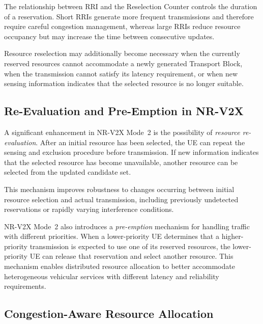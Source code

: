 The relationship between RRI and the Reselection Counter controls the
duration of a reservation. Short RRIs generate more frequent transmissions
and therefore require careful congestion management, whereas large RRIs
reduce resource occupancy but may increase the time between consecutive
updates.

Resource reselection may additionally become necessary when the currently
reserved resources cannot accommodate a newly generated Transport Block,
when the transmission cannot satisfy its latency requirement, or when new
sensing information indicates that the selected resource is no longer
suitable.

\subsection{Re-Evaluation and Pre-Emption in NR-V2X}

A significant enhancement in NR-V2X Mode~2 is the possibility of
\emph{resource re-evaluation}. After an initial resource has been selected,
the UE can repeat the sensing and exclusion procedure before transmission.
If new information indicates that the selected resource has become
unavailable, another resource can be selected from the updated candidate
set.

This mechanism improves robustness to changes occurring between initial
resource selection and actual transmission, including previously undetected
reservations or rapidly varying interference conditions.

NR-V2X Mode~2 also introduces a \emph{pre-emption} mechanism for handling
traffic with different priorities. When a lower-priority UE determines that
a higher-priority transmission is expected to use one of its reserved
resources, the lower-priority UE can release that reservation and select
another resource. This mechanism enables distributed resource allocation to
better accommodate heterogeneous vehicular services with different latency
and reliability requirements.

\subsection{Congestion-Aware Resource Allocation}

